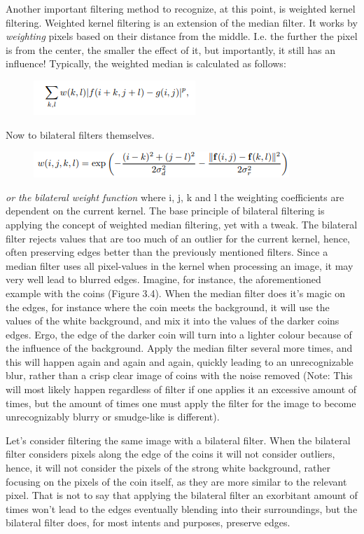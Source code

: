 \documentclass[twoside,a4paper,article]{combine}
\begin{document}
Another important filtering method to recognize, at this point, is weighted kernel filtering. Weighted kernel filtering is an extension of the median filter. It works by \textit{weighting} pixels based on their distance from the middle. I.e. the further the pixel is from the center, the smaller the effect of it, but importantly, it still has an influence! Typically, the weighted median is calculated as follows:
\begin{figure}[H]
    \centering
    \includegraphics[width=0.5\linewidth]{weightedmedian.png}
\end{figure}
Now to bilateral filters themselves. 
\begin{figure}[H]
    \centering
    \includegraphics[width=0.75\linewidth]{bilateral.png}
\end{figure}
\textit{or the bilateral weight function} where i, j, k and l the weighting coefficients are dependent on the current kernel.
The base principle of bilateral filtering is applying the concept of weighted median filtering, yet with a tweak. The bilateral filter rejects values that are too much of an outlier for the current kernel, hence, often preserving edges better than the previously mentioned filters. Since a median filter uses all pixel-values in the kernel when processing an image, it may very well lead to blurred edges. Imagine, for instance, the aforementioned example with the coins (Figure 3.4). When the median filter does it's magic on the edges, for instance where the coin meets the background, it will use the values of the white background, and mix it into the values of the darker coins edges. Ergo, the edge of the darker coin will turn into a lighter colour because of the influence of the background. Apply the median filter several more times, and this will happen again and again and again, quickly leading to an unrecognizable blur, rather than a crisp clear image of coins with the noise removed (Note: This will most likely happen regardless of filter if one applies it an excessive amount of times, but the amount of times one must apply the filter for the image to become unrecognizably blurry or smudge-like is different).

Let's consider filtering the same image with a bilateral filter. When the bilateral filter considers pixels along the edge of the coins it will not consider outliers, hence, it will not consider the pixels of the strong white background, rather focusing on the pixels of the coin itself, as they are more similar to the relevant pixel. That is not to say that applying the bilateral filter an exorbitant amount of times won't lead to the edges eventually blending into their surroundings, but the bilateral filter does, for most intents and purposes, preserve edges.
\end{document}
